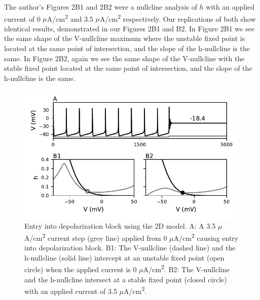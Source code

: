 The author's Figures 2B1 and 2B2 were a nullcline analysis of $h$ with an applied current of 0 $\mu$A/cm\textsuperscript{2} and 3.5 $\mu$A/cm\textsuperscript{2} respectively. Our replications of both show identical results, demonstrated in our Figures 2B1 and B2. In Figure 2B1 we see the same shape of the V-nullcline maximum where the unstable fixed point is located at the same point of intersection, and the slope of the h-nullcline is the same. In Figure 2B2, again we see the same shape of the V-nullcline with the stable fixed point located at the same point of intersection, and the slope of the h-nullcline is the same.

\begin{figure}
	\centering
	\includegraphics[scale=0.7]{../figures/figure_2.pdf}
	\caption{Entry into depolarization block using the 2D model. A: A 3.5 $\mu$A/cm\textsuperscript{2} current step (grey line) applied from 0 $\mu$A/cm\textsuperscript{2} causing entry into depolarization block. B1: The V-nullcline (dashed line) and the h-nullcline (solid line) intercept at an unstable fixed point (open circle) when the applied current is 0 $\mu$A/cm\textsuperscript{2}. B2: The V-nullcline and the h-nullcline intersect at a stable fixed point (closed circle) with an applied current of 3.5 $\mu$A/cm\textsuperscript{2}.}
	\label{fig:2}
\end{figure}

